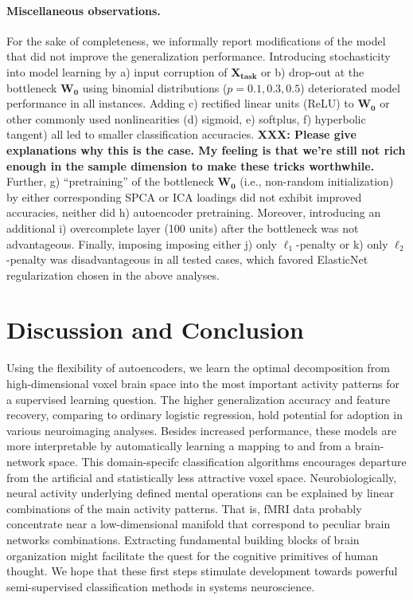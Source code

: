 \documentclass{article} %
\begin{document}
\paragraph{Miscellaneous observations.}
For the sake of completeness,
we informally report modifications of the model
that did not improve the generalization performance.
%
Introducing stochasticity into model learning by 
a) input corruption of $\mathbf{X_{task}}$ or
b) drop-out at the bottleneck $\mathbf{W_0}$ using binomial
distributions ($p=0.1, 0.3, 0.5$) deteriorated model performance
in all instances. 
%
Adding c) rectified linear units (ReLU) to $\mathbf{W_0}$ or
other commonly used nonlinearities (d) sigmoid, e) softplus,
f) hyperbolic tangent) all led to smaller classification accuracies.
%
\textbf{XXX: Please give explanations why this is the case. My feeling is that we're still not rich enough in the sample dimension to make these tricks worthwhile.}
Further, g) ``pretraining'' of the bottleneck $\mathbf{W_0}$
(i.e., non-random initialization) by 
either corresponding SPCA or ICA loadings did not exhibit improved accuracies,
neither did h) autoencoder pretraining.
%
Moreover,
introducing an additional i) overcomplete layer (100 units)
after the bottleneck was not advantageous.
%
Finally, imposing imposing either j) only $\ell_1$-penalty or 
k) only $\ell_2$-penalty was disadvantageous in all tested cases,
which favored ElasticNet regularization chosen in the above analyses.

\section{Discussion and Conclusion}
Using the flexibility of autoencoders, we
learn the optimal decomposition from high-dimensional
voxel brain space into the most important activity patterns for a
supervised learning question.
The higher generalization accuracy and feature recovery, comparing to
ordinary logistic regression, hold potential
for adoption in various neuroimaging analyses.
Besides increased performance, these models are more interpretable by
automatically learning a mapping to and from a brain-network space.
This domain-specifc classification algorithms
encourages departure from the artificial and statistically
less attractive voxel space.
Neurobiologically,
neural activity underlying defined mental operations
can be explained by linear combinations of the main activity
patterns. That is,
fMRI data probably concentrate near
a low-dimensional manifold that correspond to peculiar brain networks combinations.
Extracting fundamental building blocks of brain organization might
facilitate the quest for the cognitive primitives of
human thought.
We hope that these first steps stimulate development towards
powerful semi-supervised classification methods in systems neuroscience.
\end{document}
